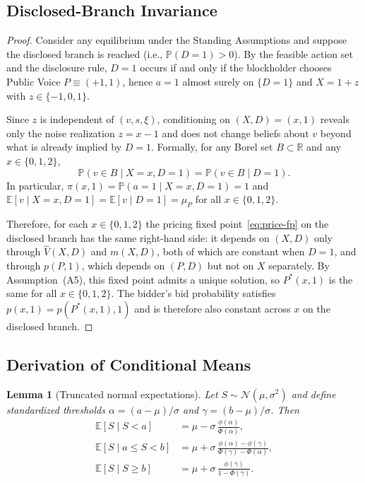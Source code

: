 \documentclass[11pt]{article}
\newtheorem{lemma}{Lemma}
\newcommand{\E}{\mathbb{E}}
\newcommand{\PP}{\mathbb{P}}
\newcommand{\1}{\mathbf{1}}
\newcommand{\R}{\mathbb{R}}
\begin{document}
\subsection{Disclosed-Branch Invariance}
\label{app:proof-disclosed-invariance}

\begin{proof}
Consider any equilibrium under the Standing Assumptions and suppose the disclosed branch is reached (i.e., $\PP(D=1)>0$). By the feasible action set and the disclosure rule, $D=1$ occurs if and only if the blockholder chooses Public Voice $P\equiv(+1,1)$, hence $a=1$ almost surely on $\{D=1\}$ and $X=1+z$ with $z\in\{-1,0,1\}$.

Since $z$ is independent of $(v,s,\xi)$, conditioning on $(X,D)=(x,1)$ reveals only the noise realization $z=x-1$ and does not change beliefs about $v$ beyond what is already implied by $D=1$. Formally, for any Borel set $B\subset\R$ and any $x\in\{0,1,2\}$,
\[
\PP(v\in B \mid X=x,D=1)=\PP(v\in B \mid D=1).
\]
In particular, $\pi(x,1)=\PP(a=1 \mid X=x,D=1)=1$ and $\E[v \mid X=x,D=1]=\E[v \mid D=1]=\mu_P$ for all $x\in\{0,1,2\}$.

Therefore, for each $x\in\{0,1,2\}$ the pricing fixed point~\eqref{eq:price-fp} on the disclosed branch has the same right-hand side: it depends on $(X,D)$ only through $\hat V(X,D)$ and $m(X,D)$, both of which are constant when $D=1$, and through $p(P,1)$, which depends on $(P,D)$ but not on $X$ separately. By Assumption~\textup{(A5)}, this fixed point admits a unique solution, so $P^*(x,1)$ is the same for all $x\in\{0,1,2\}$. The bidder's bid probability satisfies $p(x,1)=p(P^*(x,1),1)$ and is therefore also constant across $x$ on the disclosed branch.
\end{proof}

\subsection{Derivation of Conditional Means}
\label{app:deriv-conditional-means}

\begin{lemma}[Truncated normal expectations]
\label{lem:truncnorm}
Let $S\sim\mathcal{N}(\mu,\sigma^2)$ and define standardized thresholds $\alpha=(a-\mu)/\sigma$ and $\gamma=(b-\mu)/\sigma$. Then
\begin{align*}
\E[S \mid S<a] &= \mu - \sigma\,\frac{\phi(\alpha)}{\Phi(\alpha)}, \\
\E[S \mid a\le S<b] &= \mu + \sigma\,\frac{\phi(\alpha)-\phi(\gamma)}{\Phi(\gamma)-\Phi(\alpha)}, \\
\E[S \mid S\ge b] &= \mu + \sigma\,\frac{\phi(\gamma)}{1-\Phi(\gamma)}.
\end{align*}
\end{lemma}
\end{document}

